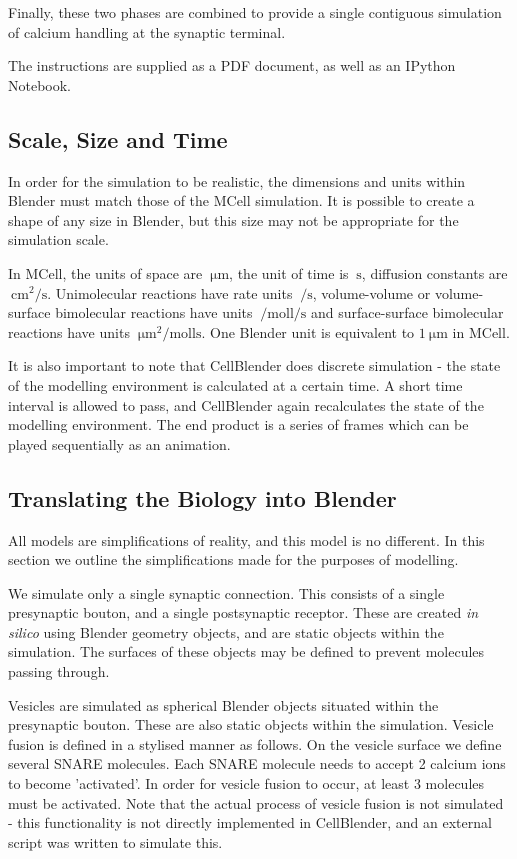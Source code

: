 \documentclass[a4paper]{article}
\begin{document}
Finally, these two phases are combined to provide a single contiguous simulation of calcium handling at the synaptic terminal.

The instructions are supplied as a PDF document, as well as an IPython Notebook.

\subsection{Scale, Size and Time}
In order for the simulation to be realistic, the dimensions and units within Blender must match those of the MCell simulation. It is possible to create a shape of any size in Blender, but this size may not be appropriate for the simulation scale.

In MCell, the units of space are $\SI{}{\micro\metre}$, the unit of time is $\SI{}{\second}$, diffusion constants are $\SI{}{\centi\metre\squared\per\second}$. Unimolecular reactions have rate units $\SI{}{\per\second}$, volume-volume or volume-surface bimolecular reactions have units $\SI{}{\per\mole\litre\per\second}$ and surface-surface bimolecular reactions have units $\SI{}{\micro\metre\squared\per\mole\litre\second}$. One Blender unit is equivalent to $\SI{1}{\micro\metre}$ in MCell. 

It is also important to note that CellBlender does discrete simulation - the state of the modelling environment is calculated at a certain time. A short time interval is allowed to pass, and CellBlender again recalculates the state of the modelling environment. The end product is a series of frames which can be played sequentially as an animation.

\subsection{Translating the Biology into Blender}
All models are simplifications of reality, and this model is no different. In this section we outline the simplifications made for the purposes of modelling.

We simulate only a single synaptic connection. This consists of a single presynaptic bouton, and a single postsynaptic receptor. These are created \textit{in silico} using Blender geometry objects, and are static objects within the simulation. The surfaces of these objects may be defined to prevent molecules passing through.

Vesicles are simulated as spherical Blender objects situated within the presynaptic bouton. These are also static objects within the simulation. Vesicle fusion is defined in a stylised manner as follows. On the vesicle surface we define several SNARE molecules. Each SNARE molecule needs to accept 2 calcium ions to become 'activated'. In order for vesicle fusion to occur, at least 3 molecules must be activated. Note that the actual process of vesicle fusion is not simulated - this functionality is not directly implemented in CellBlender, and an external script was written to simulate this.
\end{document}
